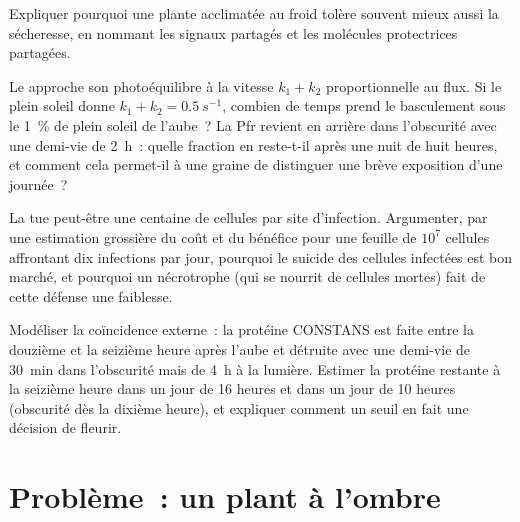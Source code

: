 \begin{exercise}[$\star\star$]\label{exo:b3:plant-molecular-physiology:9}
Expliquer pourquoi une plante acclimatée au froid tolère souvent mieux
aussi la sécheresse, en nommant les signaux partagés et les molécules
protectrices partagées.
\end{exercise}

\begin{exercise}[$\star\star\star$]\label{exo:b3:plant-molecular-physiology:10}
Le  approche son photoéquilibre à la vitesse $k_{1} + k_{2}$
proportionnelle au flux. Si le plein soleil donne $k_{1} + k_{2} =
\qty{0.5}{s^{-1}}$, combien de temps prend le basculement sous le
\qty{1}{\%} de plein soleil de l'aube~? La Pfr revient en arrière dans
l'obscurité avec une demi-vie de \qty{2}{h}~: quelle fraction en reste-t-il
après une nuit de huit heures, et comment cela permet-il à une graine de
distinguer une brève exposition d'une journée~?
\end{exercise}

\begin{exercise}[$\star\star\star$]\label{exo:b3:plant-molecular-physiology:11}
La  tue peut-être une centaine de cellules par
site d'infection. Argumenter, par une estimation grossière du coût et du
bénéfice pour une feuille de $10^{7}$ cellules affrontant dix infections
par jour, pourquoi le suicide des cellules infectées est bon marché, et
pourquoi un nécrotrophe (qui se nourrit de cellules mortes) fait de cette
défense une faiblesse.
\end{exercise}

\begin{exercise}[$\star\star\star$]\label{exo:b3:plant-molecular-physiology:12}
Modéliser la coïncidence externe~: la protéine CONSTANS est faite entre
la douzième et la seizième heure après l'aube et détruite avec une
demi-vie de \qty{30}{min} dans l'obscurité mais de \qty{4}{h} à la
lumière. Estimer la protéine restante à la seizième heure dans un jour
de 16 heures et dans un jour de 10 heures (obscurité dès la dixième
heure), et expliquer comment un seuil en fait une décision de fleurir.
\end{exercise}

\section{Problème~: un plant à l'ombre}


